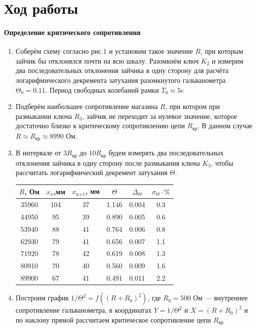 \documentclass[12pt]{article}
\begin{document}
\section*{Ход работы}
\paragraph{Определение критического сопротивления}
\begin{enumerate}
	\item
		Соберём схему согласно рис.1 и установим такое значение $R$, при которым зайчик бы отклонялся почти на всю шкалу. Разомкнём ключ $K_2$ и измерим два последовательных отклонения зайчика в одну сторону для расчёта логарифмического декремента затухания разомкнутого гальванометра $\Theta_0 = 0.11$. Период свободных колебаний рамки $T_0 \approx 5 \text{c}$
	\item
		Подберём наибольшее сопротивление магазина $R$, при котором при размыкании ключа $R_3$, зайчик не переходит за нулевое значение, которое достаточно близко к критическому сопротивлению цепи $R_\text{кр}$. В данном случае $R \approx R_\text{кр} \approx 8990$ Ом.
	\item
		В интервале от $3 R_\text{кр}$ до $10 R_\text{кр}$ будем измерять два последовательных отклонения зайчика в одну сторону после размыкания ключа $K_3$, чтобы рассчитать логарифмический декремент затухания $\Theta$.
		\begin{table}[h!]
			\centering
			\begin{tabular}{|c|c|c|c|c|c|}
			\hline
			$R$, Ом & $x_n$,мм & $x_\text{n+1}$, мм & $\Theta$ & $\Delta_\Theta$ & $\sigma_\Theta \cdot \%$ \\
			\hline
			35960 & 104 & 37 & 1.146 & 0.004 & 0.3  \\
			\hline
			44950 & 95 & 39 & 0.890 & 0.005 & 0.6\\
			\hline
			53940 & 88 & 41 & 0.764 & 0.006 & 0.8\\
			\hline
			62930 & 79 & 41 & 0.656 & 0.007 & 1.1\\
			\hline
			71920 & 78 & 42 & 0.619 & 0.008 & 1.3\\
			\hline
			80910 & 70 & 40 & 0.560 & 0.009 & 1.6\\
			\hline
			89900 & 67 & 41 & 0.491 & 0.011 & 2.2\\
			\hline
			\end{tabular}
		\end{table}
	\item
		Построим график $1/\Theta^2 = f((R + R_0)^2)$, где $R_0 = 500$ Ом --- внутреннее сопротивление гальванометра, в координатах $Y = 1 / \Theta^2$ и $X = (R + R_0)^2$ и по наклону прямой рассчитаем критическое сопротивление цепи $R_\text{кр}$

\end{enumerate}
\end{document}
